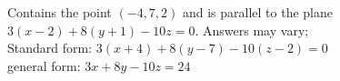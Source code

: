 {Contains the point $(-4,7,2)$ and is parallel to the plane\\
$ 3(x-2)+8(y+1) -10z=0$.
}
{Answers may vary;\\
Standard form: $3(x+4)+8(y-7)-10(z-2)=0$\\
general form: $3x+8y-10z=24$
}

